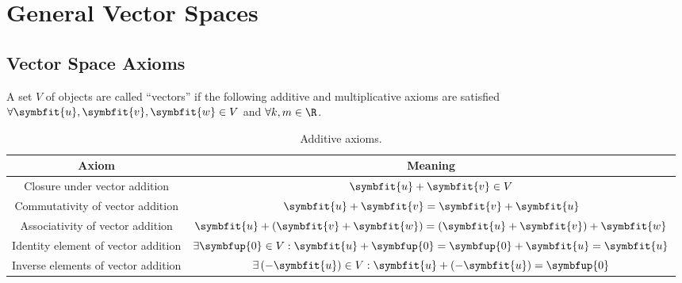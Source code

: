 \documentclass{article}
\begin{document}
\section{General Vector Spaces}
\subsection{Vector Space Axioms}
A set \(V\) of objects are called ``vectors'' if the following additive and multiplicative axioms
are satisfied \(\forall \symbfit{u}, \symbfit{v}, \symbfit{w} \in V\) and \(\forall k, m \in \R\).
\begin{table}[H]
    \centering
    \begin{tabular}{c c}
        \toprule
        \textbf{Axiom}                      & \textbf{Meaning}                                                                                                    \\
        \midrule
        Closure under vector addition       & \(\symbfit{u} + \symbfit{v} \in V\)                                                                                 \\
        Commutativity of vector addition    & \(\symbfit{u} + \symbfit{v} = \symbfit{v} + \symbfit{u}\)                                                           \\
        Associativity of vector addition    & \(\symbfit{u} + \left( \symbfit{v} + \symbfit{w} \right) = \left( \symbfit{u} + \symbfit{v} \right) + \symbfit{w}\) \\
        Identity element of vector addition & \(\exists \symbfup{0} \in V : \symbfit{u} + \symbfup{0} = \symbfup{0} + \symbfit{u} = \symbfit{u}\)                 \\
        Inverse elements of vector addition & \(\exists \left( -\symbfit{u} \right) \in V : \symbfit{u} + \left( -\symbfit{u} \right) = \symbfup{0}\)             \\
        \bottomrule
    \end{tabular}
    \caption{Additive axioms.} %
\end{table}
\end{document}
